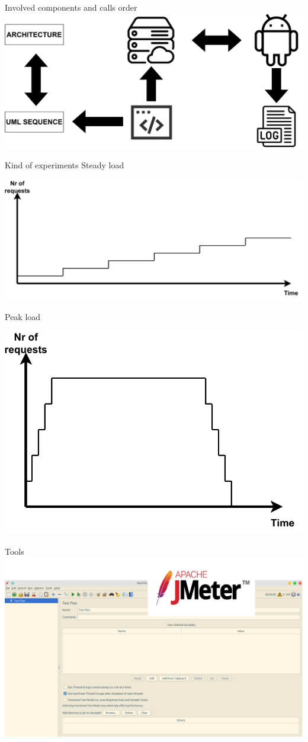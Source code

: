 \documentclass{beamer}
\begin{document}
\begin{frame}{Involved components and calls order}
    \centering
    \includegraphics[width=\textwidth]{img/components}
\end{frame}

\begin{frame}{Kind of experiments}
    Steady load
    \begin{block}{}
        \centering
        \includegraphics[width=.6\textwidth]{img/steady}
    \end{block}
    Peak load
    \begin{block}{}
        \centering
        \includegraphics[width=.35\textwidth]{img/peak}
    \end{block}
\end{frame}

\begin{frame}{Tools}
    \centering
    \includegraphics[width=.75\textwidth]{img/jmeter}
\end{frame}
\end{document}
